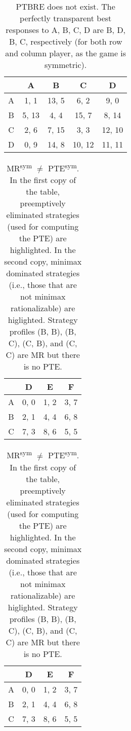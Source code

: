 \begin{table}
	\caption{
		PTBRE does not exist.
		The perfectly transparent best responses to A, B, C, D are B, D, B, C, respectively (for both row and column player, as the game is symmetric).
	}
	\label{tab:no-ptbre}
	\centering
	\begin{tabular}{|c|c|c|c|c|}
		\hline
			& A		& B	   & C	 & D	 \\
		\hline
		A 		&\cellcolor{gray!70}  1,  1 &\cellcolor{gray!20} 13,  5 &\cellcolor{gray!70}  6,  2 &\cellcolor{gray!70}  9,  0 \\
		\hline
		B		&\cellcolor{gray!20}  5, 13 &\cellcolor{gray!20}  4,  4 &\cellcolor{gray!20} 15,  7 &\cellcolor{gray!20}  8, 14 \\
		\hline
		C		&\cellcolor{gray!70}  2,  6 &\cellcolor{gray!20}  7, 15 &\cellcolor{gray!70}  3,  3 &\cellcolor{gray!20} 12, 10 \\
		\hline
		D		&\cellcolor{gray!70}  0,  9 &\cellcolor{gray!20} 14,  8 &\cellcolor{gray!20} 10, 12 &\cellcolor{gray!20} 11, 11 \\
		\hline
	\end{tabular}
\end{table}


\begin{table}
	\caption{
		MR\textsuperscript{sym} $\ne$ PTE\textsuperscript{sym}.
		In the first copy of the table, preemptively eliminated strategies (used for computing the PTE) are highlighted.
		In the second copy, minimax dominated strategies (i.e., those that are not minimax rationalizable) are higlighted.
		Strategy profiles (B, B), (B, C), (C, B), and (C, C) are MR but there is no PTE.
	}
	\label{tab:sym-mr-ne-pte}
	\centering
	\begin{tabular}{|c|c|c|c|}
		\hline
			& D		& E	   & F	  \\
		\hline
		A 		&\cellcolor{gray!80} 0, 0 &\cellcolor{gray!80} 1, 2 &\cellcolor{gray!80} 3, 7 \\
		\hline
		B		&\cellcolor{gray!80} 2, 1 &\cellcolor{gray!80} 4, 4 &\cellcolor{gray!20} 6, 8 \\
		\hline
		C		&\cellcolor{gray!80} 7, 3 &\cellcolor{gray!20} 8, 6 &\cellcolor{gray!50} 5, 5 \\
		\hline
	\end{tabular}
	\hspace{1em}
	\begin{tabular}{|c|c|c|c|}
		\hline
			& D		& E	   & F	  \\
		\hline
		A 		&\cellcolor{gray!80} 0, 0 &\cellcolor{gray!80} 1, 2 &\cellcolor{gray!80} 3, 7 \\
		\hline
		B		&\cellcolor{gray!80} 2, 1 &\cellcolor{gray!00} 4, 4 &\cellcolor{gray!00} 6, 8 \\
		\hline
		C		&\cellcolor{gray!80} 7, 3 &\cellcolor{gray!00} 8, 6 &\cellcolor{gray!00} 5, 5 \\
		\hline
	\end{tabular}
\end{table}

